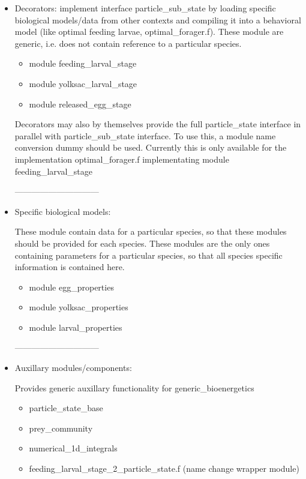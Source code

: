 \begin{itemize}
  \item Decorators: implement interface particle\_sub\_state by loading specific 
  biological models/data from other contexts and compiling it into a
  behavioral model (like optimal feeding larvae, optimal\_forager.f).
  These module are generic, i.e. does not contain reference to a particular species.

  \begin{itemize}
  \item module feeding\_larval\_stage   
  \item module yolksac\_larval\_stage                    
  \item module released\_egg\_stage 
  \end{itemize}

  Decorators may also by themselves provide the full particle\_state interface in parallel
  with particle\_sub\_state interface. To use this, a module name conversion dummy should
  be used. Currently this is only available for the implementation optimal\_forager.f 
  implementating module feeding\_larval\_stage   


------------------------------
\item Specific biological models:

  These module contain data for a particular species, so that these modules 
  should be provided for each species. These modules are the only ones containing 
  parameters for a particular species, so that all species specific information
  is contained here.

  \begin{itemize}
  \item module egg\_properties                          
  \item module yolksac\_properties                   
  \item module larval\_properties    
  \end{itemize}
------------------------------
\item Auxillary modules/components:

  Provides generic auxillary functionality for generic\_bioenergetics
  \begin{itemize}
  \item particle\_state\_base 
  \item prey\_community
  \item numerical\_1d\_integrals
  \item feeding\_larval\_stage\_2\_particle\_state.f (name change wrapper module)
  \end{itemize}

\end{itemize}




